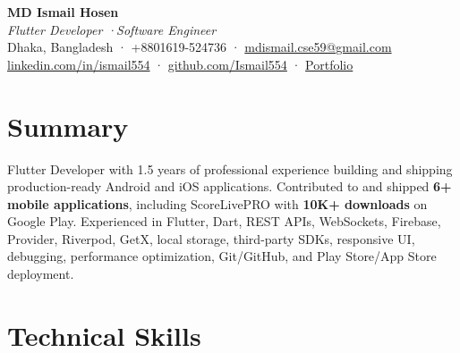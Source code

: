 \documentclass[letterpaper,10.5pt]{article}
\newcommand{\highlight}[1]{\textbf{\textcolor{impact}{#1}}}
\begin{document}
\begin{center}
  {\Huge\bfseries\color{dark} MD Ismail Hosen} \\[6pt]
  {\large\itshape\color{accent} Flutter Developer \enspace·\enspace Software Engineer} \\[8pt]

  \small
  {\color{accent}\faMapMarker}\enspace \color{mid}Dhaka, Bangladesh \enspace·\enspace
  {\color{accent}\faPhone}\enspace \color{mid}+8801619-524736 \enspace·\enspace
  \href{mailto:mdismail.cse59@gmail.com}
  {{\color{accent}\faEnvelope}\enspace \color{mid}mdismail.cse59@gmail.com}
  \\[3pt]

  \href{https://linkedin.com/in/ismail554}
  {{\color{accent}\faLinkedin}\enspace \color{mid}linkedin.com/in/ismail554}
  \enspace·\enspace
  \href{https://github.com/Ismail554}
  {{\color{accent}\faGithub}\enspace \color{mid}github.com/Ismail554}
  \enspace·\enspace
  \href{https://ismailhosen.dev.cv/}
  {{\color{accent}\faGlobe}\enspace \color{mid}Portfolio}
\end{center}

\section{Summary}
\vspace{4pt}
\small\color{mid}

Flutter Developer with 1.5 years of professional experience building and
shipping production-ready Android and iOS applications. Contributed to and
shipped \highlight{6+ mobile applications}, including ScoreLivePRO with \highlight{10K+ downloads}
on Google Play. Experienced in Flutter, Dart, REST APIs, WebSockets, Firebase,
Provider, Riverpod, GetX, local storage, third-party SDKs, responsive UI,
debugging, performance optimization, Git/GitHub, and Play Store/App Store
deployment.

\vspace{2pt}

\section{Technical Skills}
\vspace{6pt}
\end{document}
